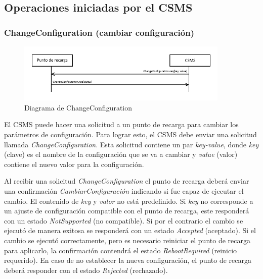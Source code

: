 \documentclass[12pt,a4paper,onecolumn,oneside]{report}
\begin{document}
\subsection{Operaciones iniciadas por el CSMS}
\label{Operaciones iniciadas por el CSMS}


\subsubsection{ChangeConfiguration (cambiar configuración)}
\label{ChangeConfiguration (cambiar configuración)}


\begin{figure}[H] 
\centering
  \includegraphics[width=0.9\textwidth]{figuras/diagramachangeconfiguration.png}
  \caption[Diagrama de \textit{ChangeConfiguration}]{Diagrama de ChangeConfiguration\\
  }
  \label{fig:diagramachangeconfiguration}
\end{figure}

El CSMS puede hacer una solicitud a un punto de recarga para cambiar los parámetros de configuración. Para lograr esto, el CSMS debe enviar una solicitud llamada \textit{ChangeConfiguration}. Esta solicitud contiene un par \textit{key-value}, donde \textit{key} (clave) es el nombre de la configuración que se va a cambiar y \textit{value} (valor) contiene el nuevo valor para la configuración.

Al recibir una solicitud \textit{ChangeConfiguration} el punto de recarga deberá enviar una confirmación \textit{CambiarConfiguración} indicando si fue capaz de ejecutar el cambio. El contenido de \textit{key} y \textit{valor} no está predefinido. Si \textit{key} no corresponde a un ajuste de configuración compatible con el punto de recarga, este responderá con un estado \textit{NotSupported} (no compatible). Si por el contrario el cambio se ejecutó de manera exitosa se responderá con un estado \textit{Accepted} (aceptado). Si el cambio se ejecutó correctamente, pero es necesario reiniciar el punto de recarga para aplicarlo, la confirmación contendrá el estado \textit{RebootRequired} (reinicio requerido). En caso de no establecer la nueva configuración, el punto de recarga deberá responder con el estado \textit{Rejected} (rechazado).
\end{document}
